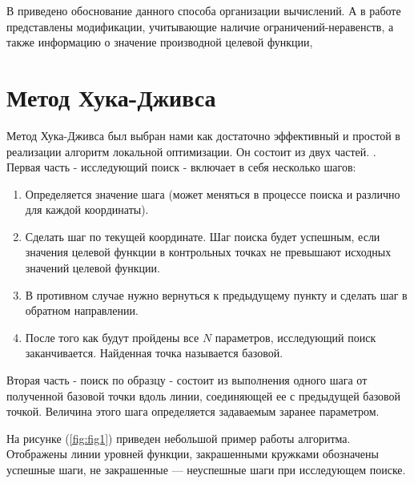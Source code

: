 \documentclass[12pt, a4paper, russian]{article}
\begin{document}
В \cite{fio_bib20} приведено обоснование данного способа организации вычислений. А в работе  \cite{fio_bib11} представлены модификации, учитывающие наличие ограничений-неравенств, а также информацию о значение производной целевой функции, 

\section{Метод Хука-Дживса}

 Метод Хука-Дживса был выбран нами как достаточно эффективный и простой в реализации алгоритм локальной оптимизации. Он состоит из двух частей.  \cite{fio_bib14, fio_bib15}. Первая часть - исследующий поиск - включает в себя несколько шагов:
 \begin{enumerate}
 	\item	Определяется значение шага (может меняться в процессе поиска и различно для каждой координаты).

 	\item	Сделать шаг по текущей координате. Шаг поиска будет успешным, если значения целевой функции в контрольных точках не превышают исходных значений целевой функции.

 	\item	В противном случае нужно вернуться к предыдущему пункту и сделать шаг в обратном направлении. 

 	\item	После того как будут пройдены все $N$ параметров, исследующий поиск заканчивается. Найденная точка называется базовой.
 \end{enumerate}

 Вторая часть - поиск по образцу - состоит из выполнения одного шага от полученной базовой точки вдоль линии, соединяющей ее с предыдущей базовой точкой. Величина этого шага определяется задаваемым заранее параметром.

 На рисунке (\ref{fig:fig1}) приведен небольшой пример работы алгоритма. Отображены линии уровней функции, закрашенными  кружками обозначены успешные шаги, не закрашенные --- неуспешные шаги при исследующем поиске.
\end{document}
